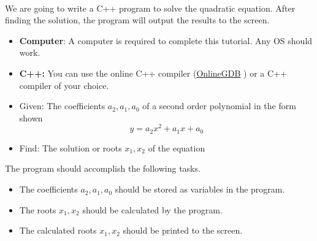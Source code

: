 \documentclass[12pt]{article}
\begin{document}
\begin{description}[labelindent=1cm]
	
	\item[\textbf{\underline{Overview:}}] \hfill \vspace{3mm}\\
	We are going to write a C++ program to solve the quadratic equation. After finding the solution, the program will output the results to the screen.
	
	\item[\textbf{\underline{System Requirements:}}] \hfill \vspace{0mm}

\begin{itemize}
	\item {\bf Computer}: A computer is required to complete this tutorial. Any OS should work.
	\item {\bf C++:} You can use the online C++ compiler (\href{https://www.onlinegdb.com/online\_c++\_compiler}{OnlineGDB} ) or a C++ compiler of your choice.
\end{itemize}

	\item[\textbf{\underline{Problem Statement:}}] \hfill \vspace{0mm}
	
	\begin{itemize}

		\item Given: The coefficients $a_2,a_1,a_0$ of a second order polynomial in the form shown
		\[y=a_2x^2+a_1x+a_0 \]
		
		\item Find: The solution or roots $x_1,x_2$ of the equation
		 
	\end{itemize}

\item[\textbf{\underline{Program Minimum Requirements:}}] \hfill \vspace{0mm}

The program should accomplish the following tasks. 


\begin{itemize}

	\item The coefficients $a_2,a_1,a_0$ should be stored as variables in the program.
	
	\item The roots $x_1, x_2$ should be calculated by the program.
	
	\item The calculated roots $x_1, x_2$ should be printed to the screen.


\end{itemize}
\end{description}
\end{document}
